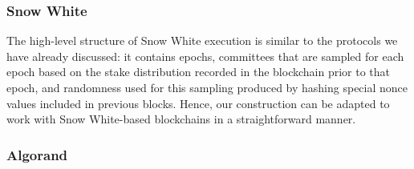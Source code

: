 
\subsubsection{Snow White}

The high-level structure of Snow White execution is similar to the protocols we have
already discussed: it contains epochs, committees that are sampled for each
epoch based on the stake distribution recorded in the blockchain prior to that
epoch, and randomness used for this sampling produced by hashing special nonce
values included in previous blocks. Hence, our construction can be adapted to
work with Snow White-based blockchains in a straightforward manner.


\subsubsection{Algorand}


